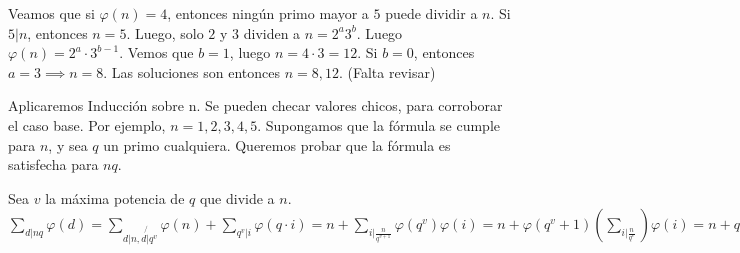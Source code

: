 \begin{sol}
	Veamos que si $\varphi(n) = 4$, entonces ning\'un primo mayor a $5$ puede dividir a $n$. Si $5|n$, entonces $n=5$. Luego, solo $2$ y $3$ dividen a $n= 2^{a} 3^{b}$. Luego $\varphi(n) = 2^{a}\cdot 3^{b-1}$. Vemos que $b = 1$, luego $n = 4\cdot 3 = 12$. Si $b = 0$, entonces $a=3 \implies n = 8$. Las soluciones son entonces $n = 8, 12$. (Falta revisar)
\end{sol}

\begin{sol}
	Aplicaremos Inducci\'on sobre n. Se pueden checar valores chicos, para corroborar el caso base. Por ejemplo, $n = 1, 2, 3, 4, 5$. Supongamos que la f\'ormula se cumple para $n$, y sea $q$ un primo cualquiera. Queremos probar que la f\'ormula es satisfecha para $nq$.

	Sea $v$ la m\'axima potencia de $q$ que divide a $n$. $\sum_{d|nq} \varphi(d) = \sum_{d|n, d\not{|} q^{v}}\varphi(n) +\sum_{q^{v} |i} \varphi(q\cdot i) = n + \sum_{i|\frac{n}{q^{v+1}}} \varphi(q^{v})\varphi(i) = n + \varphi(q^v+1) (\sum_{i|\frac{n}{q^{v}}}) \varphi(i) = n + q^{v}(q-1)\frac{n}{q^{v}}= n + (q-1)n = nq. \square$
\end{sol}

